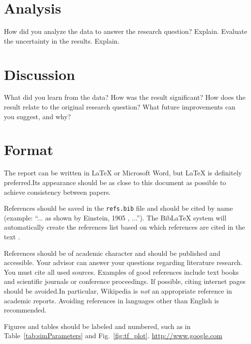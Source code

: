 \documentclass[journal, a4paper]{IEEEtran}
\begin{document}
\section{Analysis}
	How did you analyze the data to answer the research question? Explain. Evaluate the uncertainty in the results. Explain.

\section{Discussion}
	What did you learn from the data? How was the result significant? How does the result relate to the original research question? What 
    future improvements can you suggest, and why?
    
\section{Format}
	The report can be written in \LaTeX{} or Microsoft Word, but \LaTeX{} is definitely preferred.Its appearance should be as close to this document as possible to achieve consistency between papers.

	References should be saved in the {\tt refs.bib} file and should be cited by name (example: ``... as shown by Einstein, 1905 \parencite{einstein}, ...''). The BibLaTeX system will automatically create the references list based on which references are cited in the text \parencite{dirac}.

	References should be of academic character and should be published and accessible.
	Your advisor can answer your questions regarding literature research.
	You must cite all used sources.	Examples of good references include text books and scientific journals or conference proceedings.	If possible, citing internet pages should be avoided.In particular, Wikipedia is \emph{not} an appropriate reference in academic reports.
	Avoiding references in languages other than English is recommended.

	Figures and tables should be labeled and numbered, such as in Table~\ref{tab:simParameters} and Fig.~\ref{fig:tf_plot}. \url{http://www.google.com}
\end{document}

